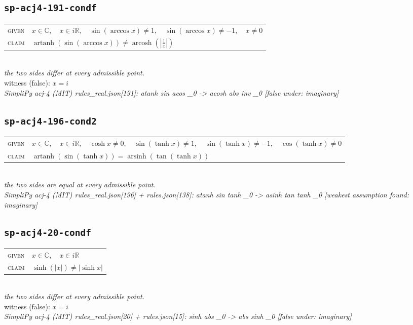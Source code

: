 \documentclass[11pt]{article}
\begin{document}
\subsection*{\texttt{sp-acj4-191-condf}}
\begin{tabular}{@{}l@{\quad}l@{}}
\textsc{given} & $x \in \mathbb{C},\quad x \in i\mathbb{R},\quad \sin\left(\arccos x\right) \neq 1,\quad \sin\left(\arccos x\right) \neq -1,\quad x \neq 0$ \\[4pt]
\textsc{claim} & $\displaystyle \operatorname{artanh}\left(\sin\left(\arccos x\right)\right) \neq \operatorname{arcosh}\left(\left|\frac{1}{x}\right|\right)$ \\
\end{tabular}\\[2pt]
{\small\emph{the two sides differ at every admissible point.}}\\
{\footnotesize\color{gray}witness (false): $x = i$}\\
\emph{SimpliPy acj-4 (MIT) rules\_real.json[191]: atanh sin acos \_0  ->  acosh abs inv \_0  [false under: imaginary]}\\

\subsection*{\texttt{sp-acj4-196-cond2}}
\begin{tabular}{@{}l@{\quad}l@{}}
\textsc{given} & $x \in \mathbb{C},\quad x \in i\mathbb{R},\quad \cosh x \neq 0,\quad \sin\left(\tanh x\right) \neq 1,\quad \sin\left(\tanh x\right) \neq -1,\quad \cos\left(\tanh x\right) \neq 0$ \\[4pt]
\textsc{claim} & $\displaystyle \operatorname{artanh}\left(\sin\left(\tanh x\right)\right) = \operatorname{arsinh}\left(\tan\left(\tanh x\right)\right)$ \\
\end{tabular}\\[2pt]
{\small\emph{the two sides are equal at every admissible point.}}\\
\emph{SimpliPy acj-4 (MIT) rules\_real.json[196] + rules.json[138]: atanh sin tanh \_0  ->  asinh tan tanh \_0  [weakest assumption found: imaginary]}\\

\subsection*{\texttt{sp-acj4-20-condf}}
\begin{tabular}{@{}l@{\quad}l@{}}
\textsc{given} & $x \in \mathbb{C},\quad x \in i\mathbb{R}$ \\[4pt]
\textsc{claim} & $\displaystyle \sinh\left(\left|x\right|\right) \neq \left|\sinh x\right|$ \\
\end{tabular}\\[2pt]
{\small\emph{the two sides differ at every admissible point.}}\\
{\footnotesize\color{gray}witness (false): $x = i$}\\
\emph{SimpliPy acj-4 (MIT) rules\_real.json[20] + rules.json[15]: sinh abs \_0  ->  abs sinh \_0  [false under: imaginary]}\\
\end{document}
